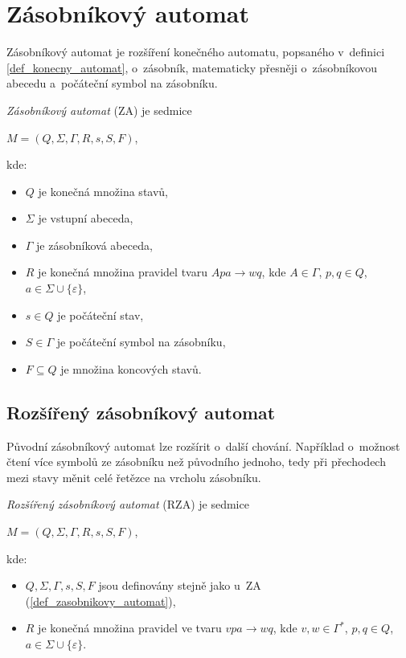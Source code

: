 \section{Zásobníkový automat}\label{kap_zasobnikovy_automat}
Zásobníkový automat je rozšíření konečného automatu, popsaného v~definici \ref{def_konecny_automat}, o~zásobník, matematicky přesněji o~zásobníkovou abecedu a~počáteční symbol na zásobníku.
\begin{definition}\label{def_zasobnikovy_automat}
    \emph{Zásobníkový automat} (ZA) je sedmice 
    \begin{center}
        $M = (Q, \Sigma, \Gamma, R, s, S, F)$,
    \end{center}
    kde:
    \begin{itemize}
        \item $Q$ je konečná množina stavů,
        \item $\Sigma$ je vstupní abeceda,
        \item $\Gamma$ je zásobníková abeceda,
        \item $R$ je konečná množina pravidel tvaru $Apa \rightarrow wq$, kde $A \in \Gamma$, $p,q \in Q$, $a \in \Sigma \cup \{\varepsilon\}$,  
        \item $s \in Q$ je počáteční stav, 
        \item $S \in \Gamma$ je počáteční symbol na zásobníku,
        \item $F \subseteq Q$ je množina koncových stavů.
    \end{itemize}
\end{definition}

\subsection*{Rozšířený zásobníkový automat}\label{kap_rozsireny_ZA}
Původní zásobníkový automat lze rozšírit o~další chování. Například o~možnost čtení více symbolů ze zásobníku než původního jednoho, tedy při přechodech mezi stavy měnit celé řetězce na vrcholu zásobníku.

\begin{definition}
    \emph{Rozšířený zásobníkový automat} (RZA) je sedmice
    \begin{center}
        $M = (Q, \Sigma, \Gamma, R, s, S, F)$,
    \end{center}
    kde:
    \begin{itemize}
        \item $Q, \Sigma, \Gamma, s, S, F$ jsou definovány stejně jako u~ZA (\ref{def_zasobnikovy_automat}),
        \item $R$ je konečná množina pravidel ve tvaru $vpa \rightarrow wq$, kde $v, w \in \Gamma^*$, $p, q \in Q$, $a \in \Sigma \cup \{\varepsilon\}$.
    \end{itemize}
\end{definition}

